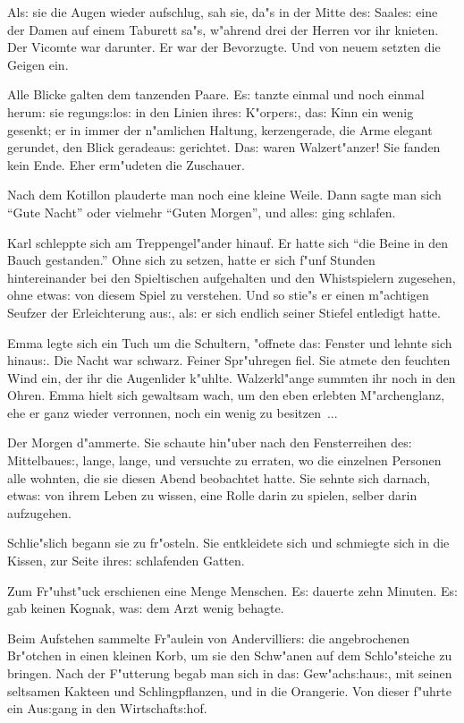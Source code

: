 \documentclass[oneside,12pt]{book}
\newcommand{\s}{s:}%
\begin{document}
Al{\s} sie die Augen wieder aufschlug, sah sie, da"s in der Mitte
de{\s} Saale{\s} eine der Damen auf einem Taburett sa"s, w"ahrend
drei der Herren vor ihr knieten. Der Vicomte war darunter. Er war
der Bevorzugte. Und von neuem setzten die Geigen ein.

Alle Blicke galten dem tanzenden Paare. E{\s} tanzte einmal und
noch einmal herum: sie regung{\s}lo{\s} in den Linien ihre{\s}
K"orper{\s}, da{\s} Kinn ein wenig gesenkt; er in immer der
n"amlichen Haltung, kerzengerade, die Arme elegant gerundet, den
Blick geradeau{\s} gerichtet. Da{\s} waren Walzert"anzer! Sie
fanden kein Ende. Eher erm"udeten die Zuschauer.

Nach dem Kotillon plauderte man noch eine kleine Weile. Dann sagte
man sich "`Gute Nacht"' oder vielmehr "`Guten Morgen"', und alle{\s}
ging schlafen.

Karl schleppte sich am Treppengel"ander hinauf. Er hatte sich
"`die Beine in den Bauch gestanden."' Ohne sich zu setzen, hatte
er sich f"unf Stunden hintereinander bei den Spieltischen
aufgehalten und den Whistspielern zugesehen, ohne etwa{\s} von
diesem Spiel zu verstehen. Und so stie"s er einen m"achtigen
Seufzer der Erleichterung au{\s}, al{\s} er sich endlich seiner
Stiefel entledigt hatte.

Emma legte sich ein Tuch um die Schultern, "offnete da{\s} Fenster
und lehnte sich hinau{\s}. Die Nacht war schwarz. Feiner
Spr"uhregen fiel. Sie atmete den feuchten Wind ein, der ihr die
Augenlider k"uhlte. Walzerkl"ange summten ihr noch in den Ohren.
Emma hielt sich gewaltsam wach, um den eben erlebten
M"archenglanz, ehe er ganz wieder verronnen, noch ein wenig zu
besitzen~...

Der Morgen d"ammerte. Sie schaute hin"uber nach den Fensterreihen
de{\s} Mittelbaue{\s}, lange, lange, und versuchte zu erraten, wo
die einzelnen Personen alle wohnten, die sie diesen Abend
beobachtet hatte. Sie sehnte sich darnach, etwa{\s} von ihrem
Leben zu wissen, eine Rolle darin zu spielen, selber darin
aufzugehen.

Schlie"slich begann sie zu fr"osteln. Sie entkleidete sich und
schmiegte sich in die Kissen, zur Seite ihre{\s} schlafenden
Gatten.

Zum Fr"uhst"uck erschienen eine Menge Menschen. E{\s} dauerte zehn
Minuten. E{\s} gab keinen Kognak, wa{\s} dem Arzt wenig behagte.

Beim Aufstehen sammelte Fr"aulein von Andervillier{\s} die
angebrochenen Br"otchen in einen kleinen Korb, um sie den
Schw"anen auf dem Schlo"steiche zu bringen. Nach der F"utterung
begab man sich in da{\s} Gew"ach{\s}hau{\s}, mit seinen seltsamen
Kakteen und Schlingpflanzen, und in die Orangerie. Von dieser
f"uhrte ein Au{\s}gang in den Wirtschaft{\s}hof.
\end{document}
